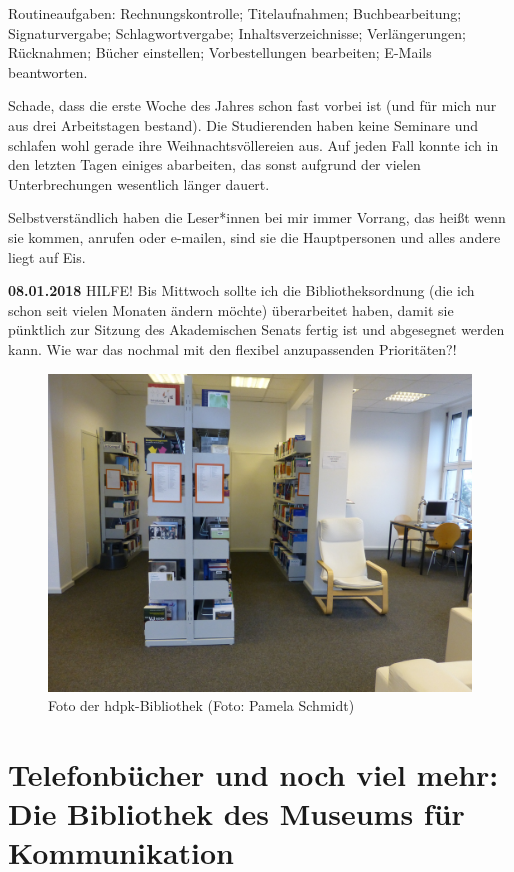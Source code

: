 \documentclass[a4paper,
fontsize=11pt,
oneside,
numbers=noperiodatend,
parskip=half-,
bibliography=totoc,
final
]{scrartcl}
\begin{document}
Routineaufgaben: Rechnungskontrolle; Titelaufnahmen; Buchbearbeitung;
Signaturvergabe; Schlagwortvergabe; Inhaltsverzeichnisse;
Verlängerungen; Rücknahmen; Bücher einstellen; Vorbestellungen
bearbeiten; E-Mails beantworten.

Schade, dass die erste Woche des Jahres schon fast vorbei ist (und für
mich nur aus drei Arbeitstagen bestand). Die Studierenden haben keine
Seminare und schlafen wohl gerade ihre Weihnachtsvöllereien aus. Auf
jeden Fall konnte ich in den letzten Tagen einiges abarbeiten, das sonst
aufgrund der vielen Unterbrechungen wesentlich länger dauert.

Selbstverständlich haben die Leser*innen bei mir immer Vorrang, das
heißt wenn sie kommen, anrufen oder e-mailen, sind sie die Hauptpersonen
und alles andere liegt auf Eis.

\textbf{08.01.2018} HILFE! Bis Mittwoch sollte ich die
Bibliotheksordnung (die ich schon seit vielen Monaten ändern möchte)
überarbeitet haben, damit sie pünktlich zur Sitzung des Akademischen
Senats fertig ist und abgesegnet werden kann. Wie war das nochmal mit
den flexibel anzupassenden Prioritäten?!

\begin{figure}
\centering
\includegraphics{img/Schmidt_5.jpg}
\caption{Foto der hdpk-Bibliothek (Foto: Pamela Schmidt)}
\end{figure}

\hypertarget{telefonbuxfccher-und-noch-viel-mehr-die-bibliothek-des-museums-fuxfcr-kommunikation}{%
\section*{Telefonbücher und noch viel mehr: Die Bibliothek des
Museums für
Kommunikation}\label{telefonbuxfccher-und-noch-viel-mehr-die-bibliothek-des-museums-fuxfcr-kommunikation}}
\end{document}
